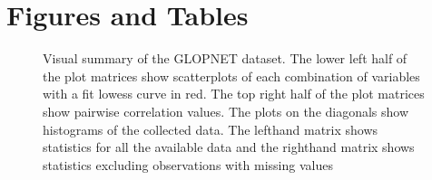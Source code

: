 \documentclass[12pt,fleqn]{article}
\begin{document}
\newpage
\begin{singlespace}

\end{singlespace}

\newpage
\section{Figures and Tables}

\begin{figure}[h]
  \caption{Visual summary of the GLOPNET dataset. The lower left half of the plot matrices show scatterplots of each combination of variables with a fit lowess curve in red. The top right half of the plot matrices show pairwise correlation values. The plots on the diagonals show histograms of the collected data. The lefthand matrix shows statistics for all the available data and the righthand matrix shows statistics excluding observations with missing values}
  \label{fig:key}
\end{figure}
\end{document}
